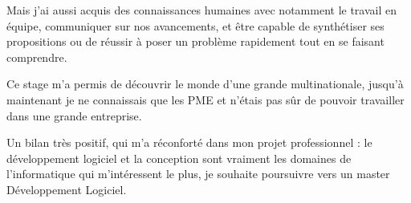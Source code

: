 	Mais j'ai aussi acquis des connaissances humaines avec notamment le travail en équipe, communiquer sur nos avancements, et être capable de synthétiser ses
	propositions ou de réussir à poser un problème rapidement tout en se faisant comprendre.

	Ce stage m'a permis de découvrir le monde d'une grande multinationale, jusqu'à maintenant je ne connaissais que les PME et n'étais pas sûr de pouvoir
	travailler dans une grande entreprise.

	Un bilan très positif, qui m'a réconforté dans mon projet professionnel : le développement logiciel et la conception sont vraiment les domaines de
	l'informatique qui m'intéressent le plus, je souhaite poursuivre vers un master Développement Logiciel.
